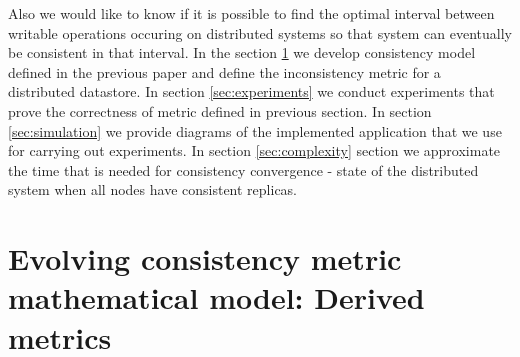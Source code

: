 \documentclass{llncs}
\begin{document}
Also we would like to know if it is possible to find the optimal interval between writable operations occuring on distributed systems so that system can eventually be consistent in that interval.
In the section \ref{sec:model} we develop consistency model defined in the previous paper \cite{bib:prob_approach} and define the inconsistency metric for a distributed datastore.
In section \ref{sec:experiments} we conduct experiments that prove the correctness of metric defined in previous section.
In section \ref{sec:simulation} we provide diagrams of the implemented application that we use for carrying out experiments.
In section \ref{sec:complexity} section we approximate the time that is needed for consistency convergence - state of the distributed system when all nodes have consistent replicas.


\section{Evolving consistency metric mathematical model: Derived metrics}\label{sec:model}
\end{document}
